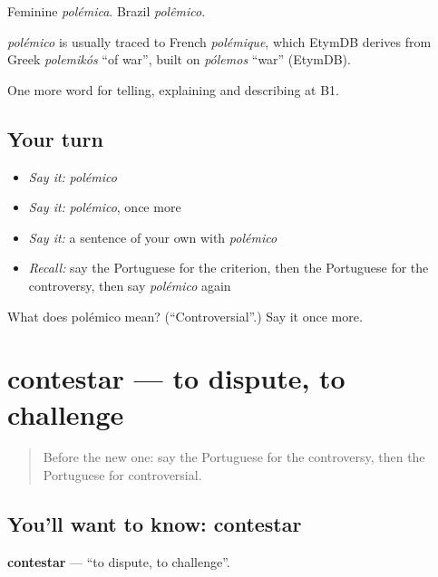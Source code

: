 Feminine \emph{polémica}. Brazil \emph{polêmico}.

\begin{cousinweb}
\emph{polémico} is usually traced to French \emph{polémique}, which EtymDB derives from Greek \emph{polemikós} \textquotedblleft{}of war\textquotedblright{}, built on \emph{pólemos} \textquotedblleft{}war\textquotedblright{} (EtymDB).
\end{cousinweb}

\begin{grammarlens}[title={What you've built}]
One more word for telling, explaining and describing at B1.
\end{grammarlens}

\subsection*{Your turn}
\begin{itemize}
\raggedright
  \item \emph{Say it:} \emph{polémico}
  \item \emph{Say it:} \emph{polémico}, once more
  \item \emph{Say it:} a sentence of your own with \emph{polémico}
  \item \emph{Recall:} say the Portuguese for the criterion, then the Portuguese for the controversy, then say \emph{polémico} again
\end{itemize}

\begin{tcolorbox}[breakable,colback=teal!4,colframe=teal!35!black,title={Before you move on}]
What does polémico mean? (\textquotedblleft{}Controversial\textquotedblright{}.) Say it once more.
\end{tcolorbox}
\section[contestar]{contestar — to dispute, to challenge}

\label{lesson:PT-C347-contestar}



\begin{quote}
Before the new one: say the Portuguese for the controversy, then the Portuguese for controversial.
\end{quote}

\subsection*{You'll want to know: contestar}
\textbf{contestar} — \textquotedblleft{}to dispute, to challenge\textquotedblright{}.

